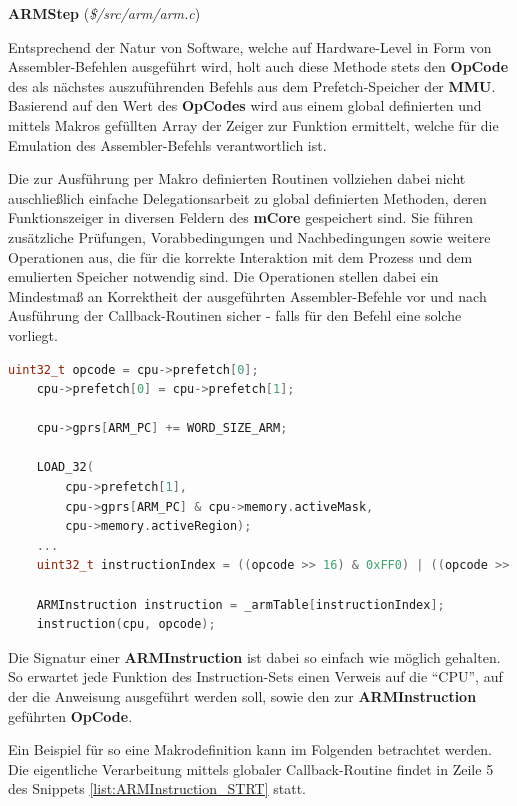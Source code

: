 \documentclass[11pt,a4paper]{scrartcl}
\newcommand{\paratitlecode}[2] {
    \vspace{5mm}
    \large \textbf{#1} \normalsize(\textit{\${#2}})
    \vspace{2mm}\newline
}
\begin{document}
\paratitlecode{ARMStep}{/src/arm/arm.c}
Entsprechend der Natur von Software, welche auf Hardware-Level in Form von Assembler-Befehlen ausgef\"uhrt wird, holt auch diese Methode stets den \textbf{OpCode} des als n\"achstes auszuf\"uhrenden Befehls aus dem Prefetch-Speicher der \textbf{MMU}. Basierend auf den Wert des \textbf{OpCodes} wird aus einem global definierten und mittels Makros gef\"ullten Array der Zeiger zur Funktion ermittelt, welche f\"ur die Emulation des Assembler-Befehls verantwortlich ist.

Die zur Ausf\"uhrung per Makro definierten Routinen vollziehen dabei nicht auschlie{\ss}lich einfache Delegationsarbeit zu global definierten Methoden, deren Funktionszeiger in diversen Feldern des \textbf{mCore} gespeichert sind. Sie f\"uhren zus\"atzliche Pr\"ufungen, Vorabbedingungen und Nachbedingungen sowie weitere Operationen aus, die f\"ur die korrekte Interaktion mit dem Prozess und dem emulierten Speicher notwendig sind. Die Operationen stellen dabei ein Mindestma{\ss} an Korrektheit der ausgef\"uhrten Assembler-Befehle vor und nach Ausf\"uhrung der Callback-Routinen sicher - falls f\"ur den Befehl eine solche vorliegt.

\vspace{5mm}
\begin{lstlisting}[language=C++, caption={Ausschnitt aus der \textbf{ARMStep}-Methode}, label={list:ARMStep}]
    uint32_t opcode = cpu->prefetch[0];
	cpu->prefetch[0] = cpu->prefetch[1];

	cpu->gprs[ARM_PC] += WORD_SIZE_ARM;
	
	LOAD_32(
	    cpu->prefetch[1],
	    cpu->gprs[ARM_PC] & cpu->memory.activeMask,
	    cpu->memory.activeRegion);
    ...
	uint32_t instructionIndex = ((opcode >> 16) & 0xFF0) | ((opcode >> 4) & 0x00F);
	
	ARMInstruction instruction = _armTable[instructionIndex];
	instruction(cpu, opcode);
\end{lstlisting}

Die Signatur einer \textbf{ARMInstruction} ist dabei so einfach wie m\"oglich gehalten. So erwartet jede Funktion des Instruction-Sets einen Verweis auf die \enquote{CPU}, auf der die Anweisung ausgef\"uhrt werden soll, sowie den zur \textbf{ARMInstruction} gef\"uhrten \textbf{OpCode}.

Ein Beispiel f\"ur so eine Makrodefinition kann im Folgenden betrachtet werden. Die eigentliche Verarbeitung mittels globaler Callback-Routine findet in Zeile 5 des Snippets \ref{list:ARMInstruction_STRT} statt.
\end{document}
